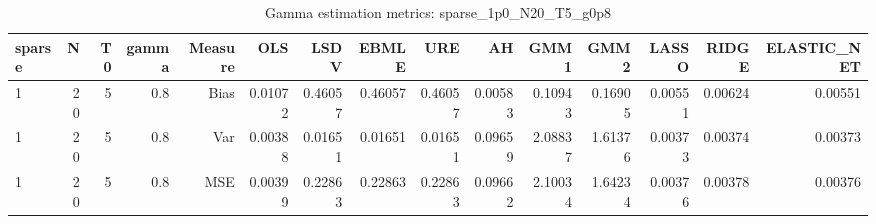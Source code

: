 \begin{table}[!htbp]\centering
\caption{Gamma estimation metrics: sparse_1p0_N20_T5_g0p8}
\label{tab:table1_sparse_1p0_N20_T5_g0p8}
\begin{tabular}{lrrrrrrrrrrrrrr}
\hline
sparse & N & T0 & gamma & Measure & OLS & LSDV & EBMLE & URE & AH & GMM1 & GMM2 & LASSO & RIDGE & ELASTIC_NET \\
\hline
1 & 20 & 5 & 0.8 & Bias & 0.01072 & 0.46057 & 0.46057 & 0.46057 & 0.00583 & 0.10943 & 0.16905 & 0.00551 & 0.00624 & 0.00551 \\
1 & 20 & 5 & 0.8 & Var & 0.00388 & 0.01651 & 0.01651 & 0.01651 & 0.09659 & 2.08837 & 1.61376 & 0.00373 & 0.00374 & 0.00373 \\
1 & 20 & 5 & 0.8 & MSE & 0.00399 & 0.22863 & 0.22863 & 0.22863 & 0.09662 & 2.10034 & 1.64234 & 0.00376 & 0.00378 & 0.00376 \\
\hline
\end{tabular}
\end{table}

